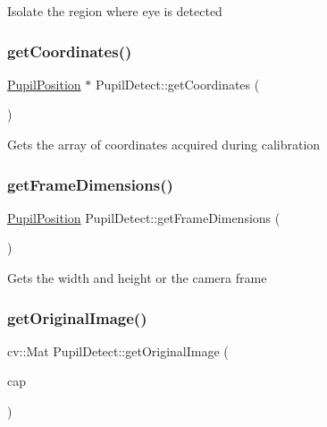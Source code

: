 Isolate the region where eye is detected \mbox{\label{class_pupil_detect_a41e24f18271f8395b1ab5043d70c03ad}} 
\subsubsection{\texorpdfstring{get\+Coordinates()}{getCoordinates()}}
{\footnotesize\ttfamily \mbox{\hyperlink{struct_pupil_position}{Pupil\+Position}} $\ast$ Pupil\+Detect\+::get\+Coordinates (\begin{DoxyParamCaption}{ }\end{DoxyParamCaption})}

Gets the array of coordinates acquired during calibration \mbox{\label{class_pupil_detect_ae2338ef12da7fd0a0c2f668e25dbec54}} 
\subsubsection{\texorpdfstring{get\+Frame\+Dimensions()}{getFrameDimensions()}}
{\footnotesize\ttfamily \mbox{\hyperlink{struct_pupil_position}{Pupil\+Position}} Pupil\+Detect\+::get\+Frame\+Dimensions (\begin{DoxyParamCaption}{ }\end{DoxyParamCaption})}

Gets the width and height or the camera frame \mbox{\label{class_pupil_detect_a09f63f95f480233d90a648e0a61c8abb}} 
\subsubsection{\texorpdfstring{get\+Original\+Image()}{getOriginalImage()}}
{\footnotesize\ttfamily cv\+::\+Mat Pupil\+Detect\+::get\+Original\+Image (\begin{DoxyParamCaption}\item[{cv\+::\+Video\+Capture}]{cap }\end{DoxyParamCaption})}

